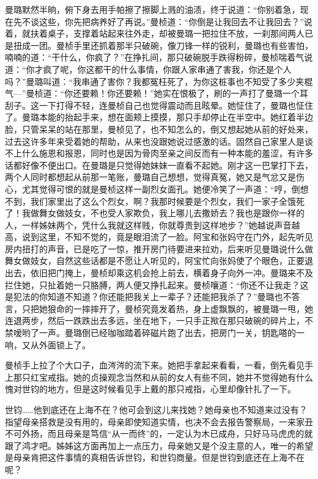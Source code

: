 \par 曼璐默然半晌，俯下身去用手帕擦了擦脚上溅的油渍，终于说道：“你别着急，现在先不谈这些，你先把病养好了再说。”曼桢道：“你倒是让我回去不让我回去？”说着，就扶着桌子，支撑着站起来往外走，却被曼璐一把拉住不放，一刹那间两人已是扭成一团。曼桢手里还抓着那半只破碗，像刀锋一样的锐利，曼璐也有些害怕，喃喃的道：“干什么，你疯了？”在挣扎间，那只破碗脱手跌得粉碎，曼桢喘着气说道：“你才疯了呢，你这都干的什么事情，你跟人家串通了害我，你还是个人吗？”曼璐叫道：“我串通了害你？我都冤枉死了，为你这桩事也不知受了多少夹棍气—”曼桢道：“你还要赖！你还要赖！”她实在恨极了，刷的一声打了曼璐一个耳刮子。这一下打得不轻，连曼桢自己也觉得震动而且眩晕。她怔住了，曼璐也怔住了。曼璐本能的抬起手来，想在面颊上摸摸，那只手却停止在半空中。她红着半边脸，只管呆呆的站在那里，曼桢见了，也不知怎么的，倒又想起她从前的好处来，过去这许多年来受着她的帮助，从来也没跟她说过感激的话。固然自己家里人是谈不上什么施恩和报恩，同时也是因为骨肉至亲之间反而有一种本能的羞涩，有许多话都好像不便出口。在曼璐是只觉得她妹妹一直看不起她。刚才这一巴掌打下去，两个人同时都想起从前那一笔账，曼璐自己想想，觉得真冤，她又是气忿又是伤心，尤其觉得可恨的就是曼桢这样一副烈女面孔。她便冷笑了一声道：“哼，倒想不到，我们家里出了这么个烈女，啊？我那时候要是个烈女，我们一家子全饿死了！我做舞女做妓女，不也受人家欺负，我上哪儿去撒娇去？我也是跟你一样的人，一样姊妹两个，凭什么我就这样贱，你就尊贵到这样地步？”她越说声音越高，说到这里，不知不觉的，竟是眼泪流了一脸。阿宝和张妈守在门外，起先听见房内扭打的声音，已是吃了一惊，推开房门待要进来拉劝，后来听见曼璐说什么做舞女做妓女，自然这些话都是不愿让人听见的，阿宝忙向张妈使了个眼色，正要退出去，依旧把门掩上，曼桢却乘这机会抢上前去，横着身子向外一冲。曼璐来不及拦住她，只扯着她一只胳膊，两人便又挣扎起来。曼桢嚷道：“你还不让我走？这是犯法的你知道不知道？你还能把我关上一辈子？还能把我杀了？”曼璐也不答言，只把她狠命的一摔摔开了，曼桢究竟发着热，身上虚飘飘的，被曼璐一甩，她连退两步，然后一跌跌出去多远，坐在地下，一只手正揿在那只破碗的碎片上，不禁嗳哟了一声。曼璐倒已经咖咖踏着碎磁片跑了出去，把房门一关，钥匙嗒的一响，又从外面锁上了。
\par 曼桢手上拉了个大口子，血涔涔的流下来。她把手拿起来看看，一看，倒先看见手上那只红宝戒指。她的贞操观念当然和从前的女人有些不同，她并不觉得她有什么愧对世钧的地方，但是这时候看见手上戴的那只戒指，心里却像针扎了一下。
\par 世钧……他到底还在上海不在？他可会到这儿来找她？她母亲也不知道来过没有？指望母亲搭救是没有用的，母亲即使知道实情，也决不会去报告警察局，一来家丑不可外扬，而且母亲是笃信“从一而终”的，一定认为木已成舟，只好马马虎虎的就跟了鸿才吧。姊姊这方面再加上一点压力，母亲她又是个没主意的人，唯一的希望是母亲肯把这件事情的真相告诉世钧，和世钧商量。但是世钧到底还在上海不在呢？

